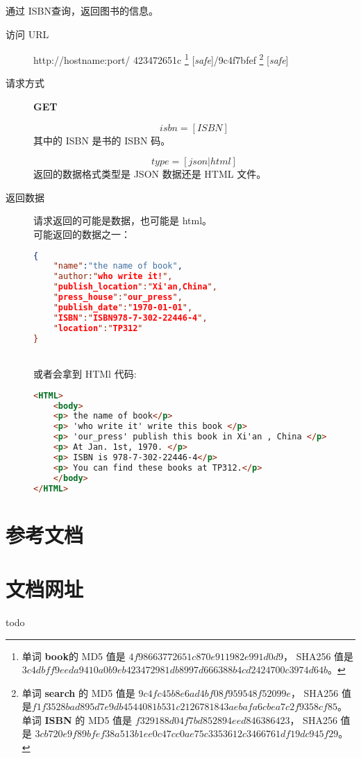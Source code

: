 \documentclass[UTF8]{ctexart}
\def\safe{[\textit{safe}]}
\def\GET{\textbf{GET}}
\begin{document}
        
        通过 ISBN查询，返回图书的信息。
        \begin{description}
        	
        	\item[访问 URL] http://hostname:port/
        	423472651c
        	\footnote{单词 \textbf{book}的
        		MD5 值是 $4f98663772651c870e911982e991d0d9$，
        		SHA256 值是 $3c4dbff9eeda9410a0b9eb423472981db8997d666388b4cd2424700c3974d64b$。
        		}
	        \safe/9c4f7bfef
	        \footnote{
	        	单词 \textbf{search} 的
	        	MD5 值是 $9c4fc45b8e6ad4bf08f959548f52099e$，
	        	SHA256 值是$f1f3528bad895d7e9db4544081b531c2126781843aebafa6cbea7c2f9358cf85$。
	        	单词 \textbf{ISBN} 的
	        	MD5 值是 $f329188d04f7bd852894eed846386423$，
	        	SHA256 值是 $3cb720e9f89bfef38a513b1ee0c47cc0ae75c3353612c3466761df19dc945f29$。
	        	}
	        \safe
	        
	        
	        \item[请求方式] \GET
	        
	        
	        $$isbn=[ISBN]$$
	        其中的 ISBN 是书的 ISBN 码。
	        
	        
	        $$type=[json|html]$$
	        返回的数据格式类型是 JSON 数据还是 HTML 文件。
	        
	        \item[返回数据] 请求返回的可能是数据，也可能是 html。
	        \\ 可能返回的数据之一：
	        \begin{lstlisting}[language=JSON]
{
	"name":"the name of book",
	"author:"who write it!",
	"publish_location":"Xi'an,China",
	"press_house":"our_press",
	"publish_date":"1970-01-01",
	"ISBN":"ISBN978-7-302-22446-4",
	"location":"TP312"
}
	        \end{lstlisting}
	        \\ 或者会拿到 HTMl 代码:
	        \begin{lstlisting}[language=HTML]
<HTML>
	<body>
	<p> the name of book</p>
	<p> 'who write it' write this book </p>
	<p> 'our_press' publish this book in Xi'an , China </p>
	<p> At Jan. 1st, 1970. </p>
	<p> ISBN is 978-7-302-22446-4</p>
	<p> You can find these books at TP312.</p>
	</body>
</HTML>
	        \end{lstlisting}
        \end{description}
        
                
        
        
        
        
        
        
        
     
    \newpage
    \begin{appendices}
    \section{参考文档}
    \section{文档网址}
    todo 
    \end{appendices}
    
\end{document}
